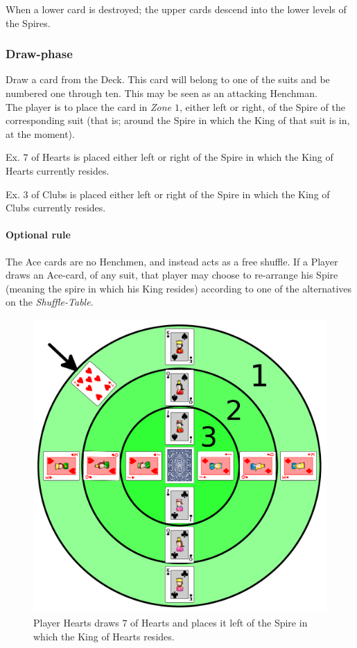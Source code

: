 \documentclass[11pt,twocolumn]{article}
\begin{document}
\noindent
When a lower card is destroyed; the upper cards descend into the lower levels of the Spires.

\subsubsection{Draw-phase}
\label{sec:playingshufflespires_drawphase}
Draw a card from the Deck.
This card will belong to one of the suits and be numbered one through ten.
This may be seen as an attacking Henchman.\\

\noindent
The player is to place the card in \textit{Zone $1$}, either left or right, of the Spire of the corresponding suit (that is; around the Spire in which the King of that suit is in, at the moment).

Ex. $7$ of Hearts is placed either left or right of the Spire in which the King of Hearts currently resides.

Ex. $3$ of Clubs is placed either left or right of the Spire in which the King of Clubs currently resides.

\paragraph{Optional rule}
The Ace cards are no Henchmen, and instead acts as a free shuffle.
If a Player draws an Ace-card, of any suit, that player may choose to re-arrange his Spire (meaning the spire in which his King resides) according to one of the alternatives on the \textit{Shuffle-Table}.

\begin{figure}[h!]
\centering
\includegraphics[width=\linewidth]{draw.png}
\caption{Player Hearts draws $7$ of Hearts and places it left of the Spire in which the King of Hearts resides.}
\label{fig:draw}
\end{figure}
\end{document}
